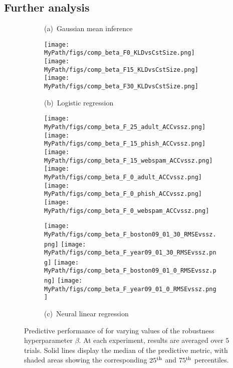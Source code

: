 \subsection{Further analysis}
\label{sec:sensitivity}

\begin{figure}[!tp]
	\begin{subfigure}[]{0.995\textwidth} 
		\centering
		\caption{(a)~Gaussian mean inference~\label{fig:betas_gaussian}}
		\centering
		\texttt{[image: \\MyPath/figs/comp\_beta\_F0\_KLDvsCstSize.png]}
		\centering
		\hfill
		\texttt{[image: \\MyPath/figs/comp\_beta\_F15\_KLDvsCstSize.png]}
		\centering
		\hfill
		\texttt{[image: \\MyPath/figs/comp\_beta\_F30\_KLDvsCstSize.png]}
		\centering
		\caption{(b)~Logistic regression~\label{fig:betas_logreg}}
		\centering 
		\hfill
		\texttt{[image: \\MyPath/figs/comp\_beta\_F\_25\_adult\_ACCvssz.png]}
		\centering
		\hfil
		\texttt{[image: \\MyPath/figs/comp\_beta\_F\_15\_phish\_ACCvssz.png]}
		\centering
		\hfill
		\texttt{[image: \\MyPath/figs/comp\_beta\_F\_15\_webspam\_ACCvssz.png]}
		\centering
		\texttt{[image: \\MyPath/figs/comp\_beta\_F\_0\_adult\_ACCvssz.png]}
		\centering
		\hfill
		\texttt{[image: \\MyPath/figs/comp\_beta\_F\_0\_phish\_ACCvssz.png]}
		\centering
		\hfill
		\texttt{[image: \\MyPath/figs/comp\_beta\_F\_0\_webspam\_ACCvssz.png]}
		\centering
		\caption{(c)~Neural linear regression~\label{fig:betas_neurlinreg}}
		\centering
		\texttt{[image: \\MyPath/figs/comp\_beta\_F\_boston09\_01\_30\_RMSEvssz.png]}
		\centering
		\texttt{[image: \\MyPath/figs/comp\_beta\_F\_year09\_01\_30\_RMSEvssz.png]}
		\centering
		\texttt{[image: \\MyPath/figs/comp\_beta\_F\_boston09\_01\_0\_RMSEvssz.png]}
		\centering
		\texttt{[image: \\MyPath/figs/comp\_beta\_F\_year09\_01\_0\_RMSEvssz.png]}
	\end{subfigure}	
	\centering
	\caption{Predictive performance of \bcores{} for varying values of the robustness hyperparameter $\beta$. At each experiment, results are averaged over $5$ trials. Solid lines display the median of the predictive metric, with shaded areas showing the corresponding $25\textsuperscript{th}$ and $75\textsuperscript{th}$ percentiles.}
	\label{fig:beta_sens}
\end{figure}

